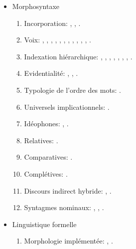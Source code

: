 \documentclass[oneside,a4paper,11pt]{article}
\newcommand{\zh}[1]{{\cn #1}}
\newcommand{\lingua}[3]{#2}%
\begin{document}
\begin{itemize}
\begin{itemize}
\item \lingua{Morphosyntax}{Morphosyntaxe}{形态句法}
\begin{enumerate}
\item  \lingua{Incorporation}{Incorporation}{名词并入}: \cite{jacques11tangut.verb}, \cite{jacques12demotion}, \cite{jacques12incorp}.
\item  \lingua{Voice}{Voix}{语态}:  \cite{jacques07passif}, \cite{jacques10refl}, \cite{jacques12demotion}, \cite{jacques13derivational.khaling}, \cite{jacques13tropative}, \cite{jacques14antipassive}, \cite{jacques15derivational.khaling}, \cite{jacques15causative},  \cite{jacques15spontaneous},  \cite{jacques16si}, \cite{jacques18generic}, \cite{jacques17volitional}.
\item \lingua{Hierarchical indexation}{Indexation hiérarchique}{人称范畴}:  \cite{jacques10inverse},     \cite{jacques12khaling},   \cite{antonov14rtau}, \cite{jacques14inverse}, \cite{jacques14rtau}, \cite{jacques16th}, \cite{jacques17stau}, \cite{jacques18generic}.
\item \lingua{Evidentiality}{Evidentialité}{示证范畴}: \cite{jacques14auditory}, \cite{jacques18nonpropositional}, \cite{jacques19egophoric}.
\item \lingua{Word-order typology}{Typologie de l'ordre des mots}{语序}: \cite{jacques13harmonization}.
\item \lingua{Implicational universals}{Universels implicationnels}{蕴涵共性}: \cite{antonov14need}.
\item \lingua{Ideophones}{Idéophones}{状貌词}: \cite{japhug14ideophones}, \cite{jacques18ipa}.
\item \lingua{Relativization}{Relatives}{关系句}: \cite{jacques16relatives}.
\item \lingua{Comparative clauses}{Comparatives}{差比句}: \cite{jacques16comparative}.
\item \lingua{Complementation}{Complétives}{补语}: \cite{jacques16complementation}.
\item \lingua{Hybrid indirect speech}{Discours indirect hybride}{混合间接引语}: \cite{jacques16complementation}, \cite{jacques17stau}.
\item \lingua{Noun phrase}{Syntagmes nominaux}{名词组}: \cite{jacques17num}, \cite{jacques17sketch}, \cite{jacques17comitative}.
\end{enumerate}

\item \lingua{Formal linguistics}{Linguistique formelle}{形式语言学}
\begin{enumerate}
\item \lingua{Implemented morphology}{Morphologie implémentée}{有计算机程序实现的形态学研究}: \cite{walther14inv.canon}, \cite{walther14compactness}.
\end{enumerate}


\end{itemize}
\end{itemize}
\end{document}
